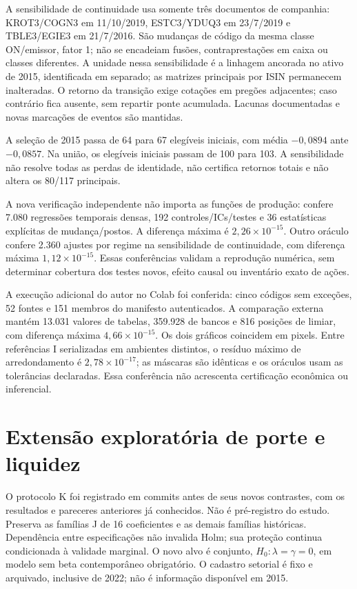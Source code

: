 \documentclass[12 pt]{article}
\begin{document}
A sensibilidade de continuidade usa somente três documentos de companhia:
KROT3/COGN3 em 11/10/2019, ESTC3/YDUQ3 em 23/7/2019 e TBLE3/EGIE3
em 21/7/2016. São mudanças de código da mesma classe ON/emissor, fator 1;
não se encadeiam fusões, contraprestações em caixa ou classes diferentes.
A unidade nessa sensibilidade é a linhagem ancorada no ativo de 2015,
identificada em separado; as matrizes principais por ISIN permanecem
inalteradas. O retorno da transição exige cotações em pregões adjacentes;
caso contrário fica ausente, sem repartir ponte acumulada. Lacunas
documentadas e novas marcações de eventos são mantidas.
\begin{table}[htbp]\centering\small
\caption{Três continuidades documentadas, bloco 21. Nova família Holm 4:
média inicial e postos em duas coortes, sem certificação econômica global.}

\end{table}
A seleção de 2015 passa de 64 para 67 elegíveis iniciais, com média
$-0,0894$ ante $-0,0857$. Na união, os elegíveis iniciais passam de 100
para 103. A sensibilidade não resolve todas as perdas de identidade,
não certifica retornos totais e não altera os 80/117 principais.

A nova verificação independente não importa as funções de produção:
confere 7.080 regressões temporais densas, 192 controles/ICs/testes e 36
estatísticas explícitas de mudança/postos. A diferença máxima é
$2,26\times 10^{-15}$. Outro oráculo confere 2.360 ajustes por regime
na sensibilidade de continuidade, com diferença máxima $1,12\times 10^{-15}$.
Essas conferências validam a reprodução numérica, sem determinar
cobertura dos testes novos, efeito causal ou inventário exato de ações.


A execução adicional do autor no Colab foi conferida: cinco códigos sem
exceções, 52 fontes e 151 membros do manifesto autenticados. A comparação
externa mantém 13.031 valores de tabelas, 359.928 de bancos e 816 posições
de limiar, com diferença máxima $4,66\times10^{-15}$. Os dois gráficos
coincidem em pixels. Entre referências I serializadas em ambientes
distintos, o resíduo máximo de arredondamento é $2,78\times10^{-17}$;
as máscaras são idênticas e os oráculos usam as tolerâncias declaradas.
Essa conferência não acrescenta certificação econômica ou inferencial.


\section{Extensão exploratória de porte e liquidez}
O protocolo K foi registrado em commits antes de seus novos contrastes,
com os resultados e pareceres anteriores já conhecidos. Não é
pré-registro do estudo. Preserva as famílias J de 16 coeficientes e
as demais famílias históricas. Dependência entre especificações não
invalida Holm; sua proteção continua condicionada à validade marginal.
O novo alvo é conjunto, $H_0:\lambda=\gamma=0$, em modelo sem beta
contemporâneo obrigatório. O cadastro setorial é fixo e arquivado,
inclusive de 2022; não é informação disponível em 2015.
\end{document}
